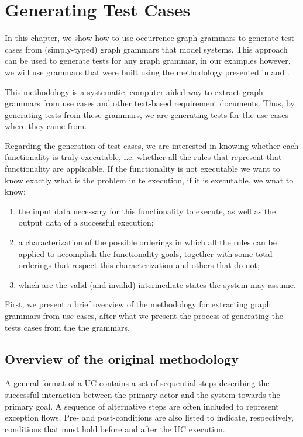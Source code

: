 \chapter{Generating Test Cases}\label{ch:tests}

In this chapter, we show how to use occurrence graph grammars to generate test cases from (simply-typed) graph grammars that model systems. This approach can be used to generate tests for any graph grammar, in our examples however, we will use grammars that were built using the methodology presented in \cite{Junior2015} and \cite{BezerraWEIT2016}.

This methodology is a systematic, computer-aided way to extract graph grammars from use cases and other text-based requirement documents. Thus, by generating tests from these grammars, we are generating tests for the use cases where they came from.

Regarding the generation of test cases, we are interested in knowing whether each functionality is truly executable, i.e. whether all the rules that represent that functionality are applicable. If the functionality is not executable we want to know exactly what is the problem in te execution, if it is executable, we wnat to know:

\begin{enumerate}
\item the input data necessary for this functionality to execute, as well as the output data of a successful execution;

\item a characterization of the possible orderings in which all the rules can be applied to accomplish the functionality goals, together with some total orderings that respect this characterization and others that do not;

\item which are the valid (and invalid) intermediate states the system may assume.
\end{enumerate}

First, we present a brief overview of the methodology for extracting graph grammars from use cases, after what we present the process of generating the tests cases from the the grammars.

\section{Overview of the original methodology}  A general format of a UC contains a set of sequential steps describing the successful interaction between the primary actor and the system towards the primary goal. A sequence of alternative steps are often included to represent exception flows. Pre- and post-conditions are also listed to indicate, respectively, conditions that must hold before and after the UC execution.

